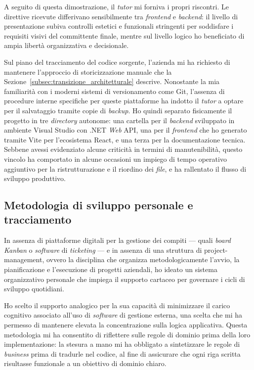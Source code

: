 A seguito di questa dimostrazione, il \textit{tutor} mi forniva i propri riscontri. Le direttive ricevute differivano sensibilmente tra \textit{frontend} e \textit{backend}: il livello di presentazione subiva controlli estetici e funzionali stringenti per soddisfare i requisiti visivi del committente finale, mentre sul livello logico ho beneficiato di ampia libertà organizzativa e decisionale.

Sul piano del tracciamento del codice sorgente, l'azienda mi ha richiesto di mantenere l'approccio di storicizzazione manuale che la Sezione~\ref{subsec:transizione_architetturale} descrive. Nonostante la mia familiarità con i moderni sistemi di versionamento come Git, l'assenza di procedure interne specifiche per queste piattaforme ha indotto il \textit{tutor} a optare per il salvataggio tramite copie di \textit{backup}. Ho quindi separato fisicamente il progetto in tre \textit{directory} autonome: una cartella per il \textit{backend} sviluppato in ambiente Visual Studio con .NET \textit{Web} API, una per il \textit{frontend} che ho generato tramite Vite per l'ecosistema React, e una terza per la documentazione tecnica. Sebbene avessi evidenziato alcune criticità in termini di manutenibilità, questo vincolo ha comportato in alcune occasioni un impiego di tempo operativo aggiuntivo per la ristrutturazione e il riordino dei \textit{file}, e ha rallentato il flusso di sviluppo produttivo.

\subsection{Metodologia di sviluppo personale e tracciamento}
\label{subsec:sviluppo_personale}

In assenza di piattaforme digitali per la gestione dei compiti --- quali \textit{board} \textit{Kanban} o \textit{software} di \textit{ticketing} --- e in assenza di una struttura di \gls{project-management}, ovvero la disciplina che organizza metodologicamente l'avvio, la pianificazione e l'esecuzione di progetti aziendali, ho ideato un sistema organizzativo personale che impiega il supporto cartaceo per governare i cicli di sviluppo quotidiani.

Ho scelto il supporto analogico per la sua capacità di minimizzare il carico cognitivo associato all'uso di \textit{software} di gestione esterna, una scelta che mi ha permesso di mantenere elevata la concentrazione sulla logica applicativa. Questa metodologia mi ha consentito di riflettere sulle regole di dominio prima della loro implementazione: la stesura a mano mi ha obbligato a sintetizzare le regole di \textit{business} prima di tradurle nel codice, al fine di assicurare che ogni riga scritta risultasse funzionale a un obiettivo di dominio chiaro.

